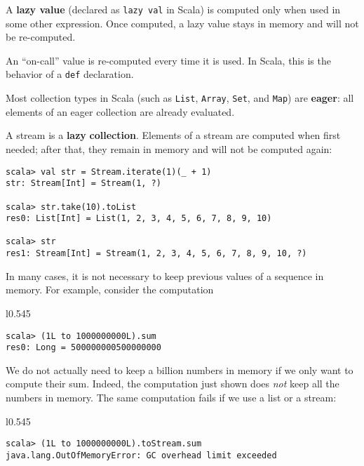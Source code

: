 A \textbf{lazy value} (declared as \lstinline!lazy val!
in Scala) is computed only when used in some other expression. Once
computed, a lazy value stays in memory and will not be re-computed.

An ``on-call'' value is re-computed every
time it is used. In Scala, this is the behavior of a \lstinline!def!
declaration.

Most collection types in Scala (such as \lstinline!List!, \lstinline!Array!,
\lstinline!Set!, and \lstinline!Map!) are \textbf{eager}:
all elements of an eager collection are already evaluated.

A stream is a \textbf{lazy} \textbf{collection}.
Elements of a stream are computed when first needed; after that, they
remain in memory and will not be computed again:
\begin{lstlisting}
scala> val str = Stream.iterate(1)(_ + 1)
str: Stream[Int] = Stream(1, ?)

scala> str.take(10).toList
res0: List[Int] = List(1, 2, 3, 4, 5, 6, 7, 8, 9, 10)

scala> str
res1: Stream[Int] = Stream(1, 2, 3, 4, 5, 6, 7, 8, 9, 10, ?)
\end{lstlisting}

In many cases, it is not necessary to keep previous values of a sequence
in memory. For example, consider the computation

\begin{wrapfigure}{l}{0.545\columnwidth}%
\vspace{-0.75\baselineskip}
\begin{lstlisting}
scala> (1L to 1000000000L).sum
res0: Long = 500000000500000000
\end{lstlisting}
\vspace{-0.75\baselineskip}
\end{wrapfigure}%

\noindent We do not actually need to keep a billion numbers in memory
if we only want to compute their sum. Indeed, the computation just
shown does \emph{not} keep all the numbers in memory. The same computation
fails if we use a list or a stream:

\begin{wrapfigure}{l}{0.545\columnwidth}%
\vspace{-0.9\baselineskip}
\begin{lstlisting}
scala> (1L to 1000000000L).toStream.sum
java.lang.OutOfMemoryError: GC overhead limit exceeded
\end{lstlisting}
\vspace{-1.5\baselineskip}
\end{wrapfigure}%

